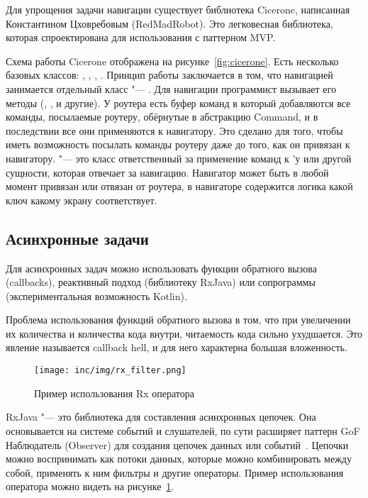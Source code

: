 Для упрощения задачи навигации существует библиотека Cicerone, написанная Константином Цховребовым (RedMadRobot).
Это легковесная библиотека, которая спроектирована для использования с паттерном MVP\@.

Схема работы Cicerone отображена на рисунке~\ref{fig:cicerone}.
Есть несколько базовых классов: , , , .
Принцип работы заключается в том, что навигацией занимается отдельный класс "--- .
Для навигации программист вызывает его методы (, ,  и другие).
У роутера есть буфер команд в который добавляются все команды, посылаемые роутеру, обёрнутые в абстракцию Command, и в последствии все они применяются к навигатору.
Это сделано для того, чтобы иметь возможность посылать команды роутеру даже до того, как он привязан к навигатору.
 "--- это класс ответственный за применение команд к 'у или другой сущности, которая отвечает за навигацию.
Навигатор может быть в любой момент привязан или отвязан от роутера, в навигаторе содержится логика какой ключ какому экрану соответствует.

\subsection{Асинхронные задачи}
\label{subsec:asyncTasks}
Для асинхронных задач можно использовать функции обратного вызова (callbacks), реактивный подход (библиотеку RxJava) или сопрограммы (экспериментальная возможность Kotlin).

Проблема использования функций обратного вызова в том, что при увеличении их количества и количества кода внутри, читаемость кода сильно ухудшается.
Это явление называется callback hell, и для него характерна большая вложенность.

\begin{figure}[ht]
  \centering
  \texttt{[image: inc/img/rx\_filter.png]}
  \caption{Пример использования Rx оператора }
  \label{fig:rxFilter}
\end{figure}

RxJava "--- это библиотека для составления асинхронных цепочек.
Она основывается на системе событий и слушателей, по сути расширяет паттерн GoF Наблюдатель (Observer) для создания цепочек данных или событий~\cite{reactivex}.
Цепочки можно воспринимать как потоки данных, которые можно комбинировать между собой, применять к ним фильтры и другие операторы. Пример использования оператора можно видеть на рисунке~\ref{fig:rxFilter}.

